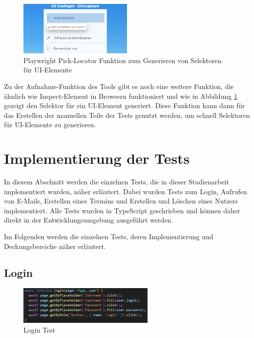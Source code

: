 \begin{figure}[H]
    \centering
    \includegraphics[width=0.5\textwidth]{images/Playwright_PickLocator.png}
    \caption{Playwright Pick-Locator Funktion zum Generieren von Selektoren für UI-Elemente}
    \label{fig:playwright-pick-locator}
\end{figure}

Zu der Aufnahme-Funktion des Tools gibt es noch eine weitere Funktion, die ähnlich wie Inspect-Element in Browsern funktioniert und wie in Abbildung \ref{fig:playwright-pick-locator} gezeigt den Selektor für ein UI-Element generiert.
Diese Funktion kann dann für das Erstellen der manuellen Teile der Tests genutzt werden, um schnell Selektoren für UI-Elemente zu generieren.



\section{Implementierung der Tests}

In diesem Abschnitt werden die einzelnen Tests, die in dieser Studienarbeit implementiert wurden, näher erläutert.
Dabei wurden Tests zum Login, Aufrufen von E-Mails, Erstellen eines Termins und Erstellen und Löschen eines Nutzers implementiert.
Alle Tests wurden in TypeScript geschrieben und können daher direkt in der Entwicklungsumgebung ausgeführt werden.

Im Folgenden werden die einzelnen Tests, deren Implementierung und Deckungsbereiche näher erläutert.
\newpage
\subsection*{Login}

\begin{figure}[H]
    \centering
    \includegraphics[width=0.6\textwidth]{images/LoginTest.png}
    \caption{Login Test}
    \label{fig:login-test}
\end{figure}

